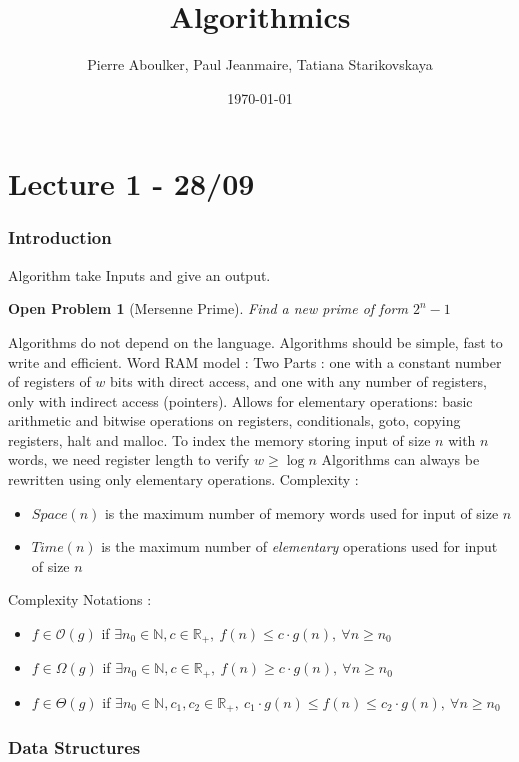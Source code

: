\documentclass[12pt]{cours}
\title{Algorithmics}
\author{Pierre Aboulker, Paul Jeanmaire, Tatiana Starikovskaya}
\date{\today}
\newtheorem{openpb}{Open Problem}
\begin{document}
\part[First Algorithms]{Lecture 1 - 28/09}
\localtableofcontents

\section*{Introduction}
Algorithm take Inputs and give an output.
\begin{openpb}[Mersenne Prime]
    Find a new prime of form $2^{n} - 1$
\end{openpb}
Algorithms do not depend on the language. Algorithms should be simple, fast to write and efficient.
Word RAM model : Two Parts : one with a constant number of registers of $w$ bits with direct access, and one with any number of registers, only with indirect access (pointers).
Allows for elementary operations: basic arithmetic and bitwise operations on registers, conditionals, goto, copying registers, halt and malloc.
To index the memory storing input of size $n$ with $n$ words, we need register length to verify $w \geq \log n$
Algorithms can always be rewritten using only elementary operations.
Complexity :
\begin{itemize}
    \item $Space(n)$ is the maximum number of memory words used for input of size $n$
    \item $Time(n)$ is the maximum number of \textsl{elementary} operations used for input of size $n$
\end{itemize}
Complexity Notations :
\begin{itemize}
    \item $f \in \mathcal{O}(g)$ if $\exists n_0 \in \mathbb{N}, c \in \mathbb{R}_{+},\ f(n) \leq c \cdot g(n), \ \forall n \geq n_0$
    \item $f \in \Omega(g)$ if $\exists n_0 \in \mathbb{N}, c \in \mathbb{R}_{+},\ f(n) \geq c \cdot g(n), \ \forall n \geq n_0$
    \item $f \in \Theta(g)$ if $\exists n_0 \in \mathbb{N}, c_{1}, c_{2} \in \mathbb{R}_{+},\ c_{1} \cdot g(n) \leq f(n) \leq c_{2} \cdot g(n), \ \forall n \geq n_0$
\end{itemize}

\section{Data Structures}
\end{document}
